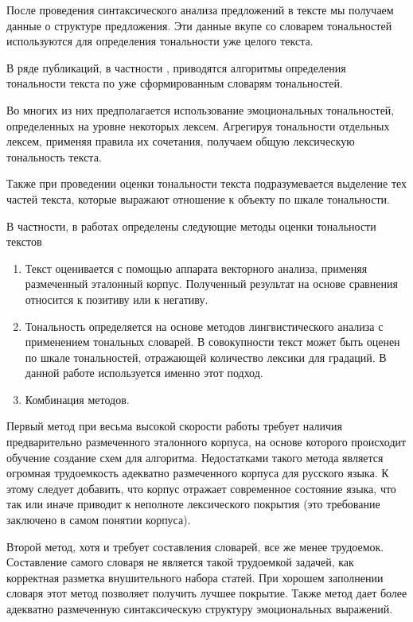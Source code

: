 \documentclass[a4paper,14pt,russian]{extreport}
\begin{document}
После проведения синтаксического анализа предложений в тексте мы получаем данные о структуре предложения. Эти данные вкупе со словарем тональностей используются для определения тональности уже целого текста.

В ряде публикаций, в частности , приводятся алгоритмы определения тональности текста по уже сформированным словарям тональностей.

Во многих из них предполагается использование эмоциональных тональностей, определенных на уровне некоторых лексем. Агрегируя тональности отдельных лексем, применяя правила их сочетания, получаем общую лексическую тональность текста.

Также при проведении оценки тональности текста подразумевается выделение тех частей текста, которые выражают отношение к объекту по шкале тональности.

В частности, в работах определены следующие методы оценки тональности текстов~\cite{gubin}

\begin{enumerate}
\item Текст оценивается с помощью аппарата векторного анализа, применяя размеченный эталонный корпус. Полученный результат на основе сравнения относится к позитиву или к негативу.
\item Тональность определяется на основе методов лингвистического анализа с применением тональных словарей. В совокупности текст может быть оценен по шкале тональностей, отражающей количество лексики для градаций. В данной работе используется именно этот подход.
\item Комбинация методов.
\end{enumerate}

Первый метод при весьма высокой скорости работы требует наличия предварительно размеченного эталонного корпуса, на основе которого происходит обучение создание схем для алгоритма. Недостатками такого метода является огромная трудоемкость адекватно размеченного корпуса для русского языка. К этому следует добавить, что корпус отражает современное состояние языка, что так или иначе приводит к неполноте лексического покрытия (это требование заключено в самом понятии корпуса).

Второй метод, хотя и требует составления словарей, все же менее трудоемок. Составление самого словаря не является такой трудоемкой задачей, как корректная разметка внушительного набора статей. При хорошем заполнении словаря этот метод позволяет получить лучшее покрытие. Также метод дает более адекватно размеченную синтаксическую структуру эмоциональных выражений.
\end{document}
